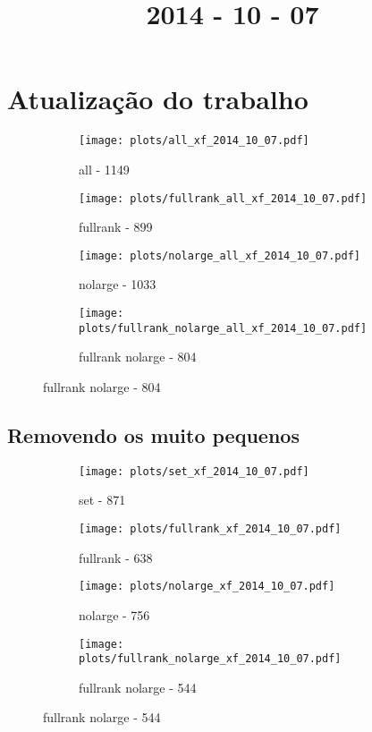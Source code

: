 \documentclass{article}
\title{2014 - 10 - 07}
\author{}
\date{}
\begin{document}
\maketitle
\section{Atualização do trabalho}

\begin{figure}[H]
  \centering
  \begin{subfigure}{0.48\textwidth}
    \texttt{[image: plots/all\_xf\_2014\_10\_07.pdf]}
    \caption{all - 1149}
  \end{subfigure}
  \begin{subfigure}{0.48\textwidth}
    \texttt{[image: plots/fullrank\_all\_xf\_2014\_10\_07.pdf]}
    \caption{fullrank - 899}
  \end{subfigure}
  \begin{subfigure}{0.48\textwidth}
    \texttt{[image: plots/nolarge\_all\_xf\_2014\_10\_07.pdf]}
    \caption{nolarge - 1033}
  \end{subfigure}
  \begin{subfigure}{0.48\textwidth}
    \texttt{[image: plots/fullrank\_nolarge\_all\_xf\_2014\_10\_07.pdf]}
    \caption{fullrank nolarge - 804}
  \end{subfigure}
\end{figure}

\subsection{Removendo os muito pequenos}

\begin{figure}[H]
  \centering
  \begin{subfigure}{0.48\textwidth}
    \texttt{[image: plots/set\_xf\_2014\_10\_07.pdf]}
    \caption{set - 871}
  \end{subfigure}
  \begin{subfigure}{0.48\textwidth}
    \texttt{[image: plots/fullrank\_xf\_2014\_10\_07.pdf]}
    \caption{fullrank - 638}
  \end{subfigure}
  \begin{subfigure}{0.48\textwidth}
    \texttt{[image: plots/nolarge\_xf\_2014\_10\_07.pdf]}
    \caption{nolarge - 756}
  \end{subfigure}
  \begin{subfigure}{0.48\textwidth}
    \texttt{[image: plots/fullrank\_nolarge\_xf\_2014\_10\_07.pdf]}
    \caption{fullrank nolarge - 544}
  \end{subfigure}
\end{figure}
\end{document}
